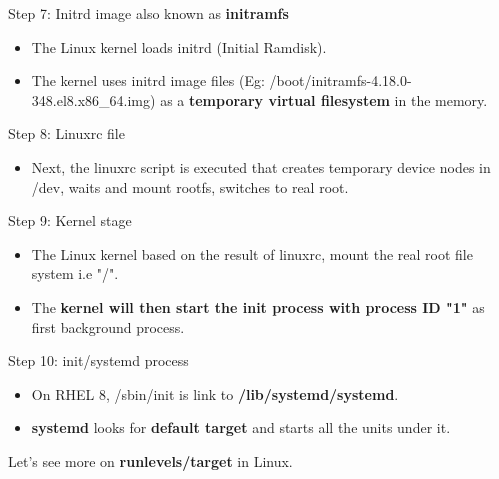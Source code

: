 \begin{flushleft}
Step 7: Initrd image also known as \textbf{initramfs}
\begin{itemize}	
	\item The Linux kernel loads initrd (Initial Ramdisk).
	\item The kernel uses initrd image files (Eg: /boot/initramfs-4.18.0-348.el8.x86\_64.img) as a \textbf{temporary virtual filesystem} in the memory.
\end{itemize}

Step 8: Linuxrc file
\begin{itemize}
	\item Next, the linuxrc script is executed that creates temporary device nodes in /dev, waits and mount rootfs, switches to real root.
\end{itemize}
\newpage
Step 9: Kernel stage
\begin{itemize}
	\item The Linux kernel based on the result of linuxrc, mount the real root file system i.e "/".
	\item The \textbf{kernel will then start the init process with process ID "1"} as first background process.
\end{itemize}

Step 10: init/systemd process
\begin{itemize}
	\item On RHEL 8, /sbin/init is link to \textbf{/lib/systemd/systemd}.
	\item \textbf{systemd} looks for \textbf{default target} and starts all the units under it.
\end{itemize}


Let's see more on \textbf{runlevels/target} in Linux.

\end{flushleft}
\newpage


